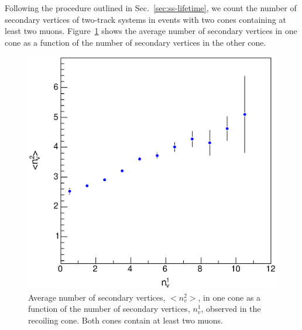 \documentclass[aps,prd,preprint,floatfix,nofootinbib,superscriptaddress,showpacs,amssymb]{revtex4}
\begin{document}
 Following the procedure outlined in Sec.~\ref{sec:ss-lifetime}, we count
 the number of secondary vertices of two-track systems in events with two
 cones containing at least two muons. Figure~\ref{fig:fig_27bis} shows the
 average number of secondary vertices in one cone as a function of the
 number of secondary vertices in the other cone.
 \begin{figure}
 \begin{center}
 \vspace{-0.3in}
 \leavevmode
 \includegraphics*[width=\textwidth]{fa0_27bis.eps}
 \caption[]{Average number of secondary vertices, $<n^2_v>$, in one cone as
            a function of the number of secondary vertices, $n^1_v$, observed
            in the recoiling cone. Both cones contain at least two muons.}
 \label{fig:fig_27bis}
 \end{center}
 \end{figure}
\end{document}
